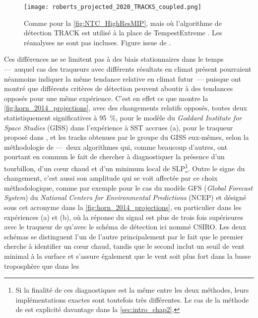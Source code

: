 \documentclass[../main.tex]{subfiles}
\begin{document}
\begin{figure}[htbp]
    \centering
    \texttt{[image: roberts\_projected\_2020\_TRACKS\_coupled.png]}
    \caption{Comme pour la \cref{fig:NTC_HighResMIP}, mais où l'algorithme de détection TRACK \parencite{hodges_how_2017} est utilisé à la place de
    TempestExtreme \parencite{ullrich_tempestextremes_2017,zarzycki_assessing_2017}. Les réanalyses ne sont pas incluses. Figure issue de
    \textcite{roberts_projected_2020}.}
    \label{fig:NTC_HighResMIP_TRACK}
\end{figure}

Ces différences ne se limitent pas à des biais stationnaires dans le temps ---~auquel cas des traqueurs avec différents résultats en climat présent pourraient
néanmoins indiquer la même tendance relative en climat futur~--- puisque \textcite{horn_tracking_2014} ont montré que différents critères de détection peuvent
aboutir à des tendances opposés pour une même expérience. C'est en effet ce que montre la \cref{fig:horn_2014_projections}, avec des changements relatifs
opposés, toutes deux statistiquement significatives à \SI{95}{\percent}, pour le modèle du \textit{Goddard Institute for Space Studies} (GISS) dans l'expérience
à SST accrues (a), pour le traqueur proposé dans \textcite{zhao_simulations_2009}, et les tracks obtenues par le groupe du GISS eux-mêmes, selon la méthodologie de
\textcite{camargo_improving_2002} ---~deux algorithmes qui, comme beaucoup d'autres, ont pourtant en commun le fait de chercher à diagnostiquer la présence d'un
tourbillon, d'un cœur chaud et d'un minimum local de SLP\footnote{Si la finalité de ces diagnostiques est la même entre les deux méthodes, leurs implémentations
exactes sont toutefois très différentes. Le cas de la méthode de \textcite{camargo_improving_2002} est explicité davantage dans la \cref{sec:intro_chap2}.}. Outre
le signe du changement, c'est aussi son amplitude qui se voit affectée par ce choix méthodologique, comme par exemple pour le cas du modèle GFS (\textit{Global
Forecast System}) du \textit{National Centers for Environmental Predictions} (NCEP) et désigné sous cet acronyme dans la \cref{fig:horn_2014_projections}, en
particulier dans les expériences (a) et (b), où la réponse du signal est plus de trois fois supérieures avec le traqueur de \textcite{zhao_simulations_2009} qu'avec
le schéma de détection ici nommé CSIRO. Les deux schémas se distinguent l'un de l'autre principalement par le fait que le premier cherche à identifier un cœur
chaud, tandis que le second inclut un seuil de vent minimal à la surface et s'assure également que le vent soit plus fort dans la basse troposphère que dans les
\end{document}
